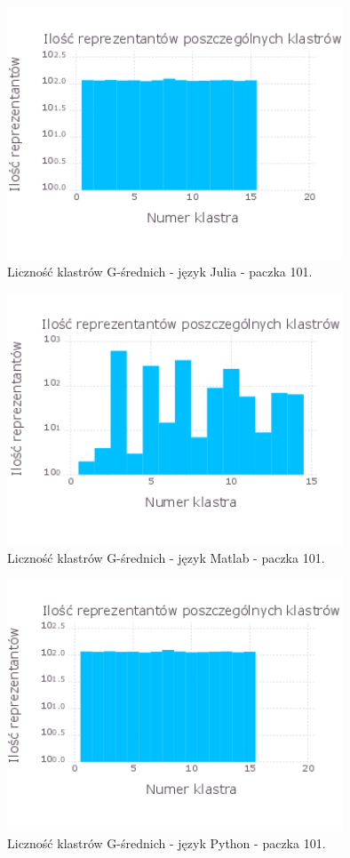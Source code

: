 \begin{figure}[!htp]
	\centering
	\includegraphics[width=10cm]{Grafika/JuliaAfterGmeans}
	\caption{Liczność klastrów G-średnich - język Julia - paczka 101.}
	\label{fig:julia_gmeans_hist}
\end{figure}

\begin{figure}[!htp]
	\centering
	\includegraphics[width=10cm]{Grafika/MatlabAfterGmeans}
	\caption{Liczność klastrów G-średnich - język Matlab - paczka 101.}
	\label{fig:matlab_gmeans_hist}
\end{figure}

\begin{figure}[!htp]
	\centering
	\includegraphics[width=10cm]{Grafika/PythonAfterGmeans}
	\caption{Liczność klastrów G-średnich - język Python - paczka 101.}
	\label{fig:python_gmeans_hist}
\end{figure}


